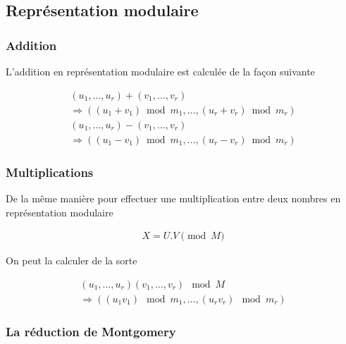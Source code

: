 \documentclass[letterpaper]{article}
\begin{document}
\subsection{Représentation modulaire}

\subsubsection{Addition}

L'addition en représentation modulaire est calculée de la façon suivante

\begin{equation}
  \begin{split}
    (u_1, \dots, u_r) + (v_1, \dots, v_r) \\
     \Rightarrow ((u_1 + v_1) \bmod m_1, \dots, (u_r + v_r) \bmod m_r)
  \end{split}
\end{equation}
\begin{equation}
  \begin{split}
    (u_1, \dots, u_r) - (v_1, \dots, v_r) \\
      \Rightarrow ((u_1 - v_1) \bmod m_1, \dots, (u_r - v_r) \bmod m_r)
  \end{split}
\end{equation}

\subsubsection{Multiplications}

De la même manière pour effectuer une multiplication entre deux nombres en
représentation modulaire

\begin{equation}
  \begin{split}
    X = U.V \pmod M
  \end{split}
\end{equation}

On peut la calculer de la sorte

\begin{equation}
  \begin{split}
    (u_1, \dots, u_r)  (v_1, \dots, v_r) \mod M \\
      \Rightarrow ((u_1 v_1) \mod m_1, \dots, (u_r v_r) \mod m_r)
  \end{split}
\end{equation}

\subsubsection{La réduction de Montgomery}
\end{document}
